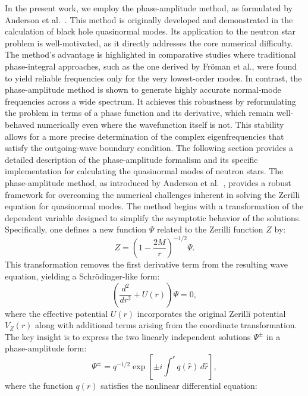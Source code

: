 In the present work, we employ the phase-amplitude method, as formulated by Anderson et al.~\cite{Anderson_inverse_cowling}. This method is originally developed and demonstrated in the calculation of black hole quasinormal modes. Its application to the neutron star problem is well-motivated, as it directly addresses the core numerical difficulty. The method's advantage is highlighted in comparative studies where traditional phase-integral approaches, such as the one derived by Fr\"oman et al.\cite{Fromen}, were found to yield reliable frequencies only for the very lowest-order modes. In contrast, the phase-amplitude method is shown to generate highly accurate normal-mode frequencies across a wide spectrum. It achieves this robustness by reformulating the problem in terms of a phase function and its derivative, which remain well-behaved numerically even where the wavefunction itself is not. This stability allows for a more precise determination of the complex eigenfrequencies that satisfy the outgoing-wave boundary condition. The following section provides a detailed description of the phase-amplitude formalism and its specific implementation for calculating the quasinormal modes of neutron stars. 
The phase-amplitude method, as introduced by Anderson et al.~\cite{Anderson_inverse_cowling}, provides a robust framework for overcoming the numerical challenges inherent in solving the Zerilli equation for quasinormal modes. The method begins with a transformation of the dependent variable designed to simplify the asymptotic behavior of the solutions. Specifically, one defines a new function \(\Psi\) related to the Zerilli function \(Z\) by:
\begin{equation}
	Z = \left(1 - \frac{2M}{r}\right)^{-1/2} \Psi.
\end{equation}
This transformation removes the first derivative term from the resulting wave equation, yielding a Schrödinger-like form:
\begin{equation}
	\left( \frac{d^2}{dr^2} + U(r) \right) \Psi = 0,
\end{equation}
where the effective potential \(U(r)\) incorporates the original Zerilli potential \(V_Z(r)\) along with additional terms arising from the coordinate transformation. The key insight is to express the two linearly independent solutions \(\Psi^\pm\) in a phase-amplitude form:
\begin{equation}
	\Psi^\pm = q^{-1/2} \exp\left[ \pm i \int^r q(\hat{r}) \, d\hat{r} \right],
\end{equation}
where the function \(q(r)\) satisfies the nonlinear differential equation\cite{Anderson_inverse_cowling}:

